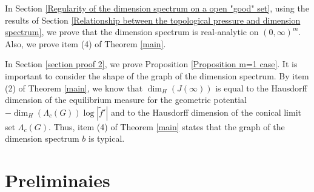 \documentclass{article}
\theoremstyle{definition}
\begin{document}
In Section \ref{Regularity of the dimension spectrum on a open "good" set}, using the results of Section \ref{Relationship between the topological pressure and dimension spectrum}, 
 we prove that the dimension spectrum is real-analytic on $(0,\infty)^m$. Also, we prove item (4) of Theorem \ref{main}.
 

In Section \ref{section proof 2},  we prove Proposition \ref{Proposition m=1 case}. It is important to consider the shape of the graph of the dimension spectrum. By item (2) of Theorem \ref{main}, we know that $\dim_H(J(\infty))$ is equal to the Hausdorff dimension of the equilibrium measure for the geometric potential $-\dim_H(\Lambda_c(G))\log|\tilde f'|$ and to the Hausdorff dimension of the conical limit set $\Lambda_c(G)$. Thus, item (4) of Theorem \ref{main} states that the graph of the dimension spectrum 
$b$ is typical. 
 


\section{Preliminaies}
\end{document}
